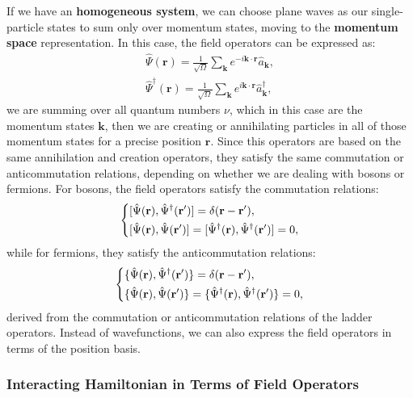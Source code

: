 If we have an \textbf{homogeneous system}, we can choose plane waves as our single-particle states to sum only over momentum states, moving to the \textbf{momentum space} representation. In this case, the field operators can be expressed as:
\[
    \begin{aligned}
        \hat{\Psi}(\mathbf{r}) = \frac{1}{\sqrt{\Omega}} \sum_{\mathbf{k}} e^{-i \mathbf{k} \cdot \mathbf{r}} \hat{a}_{\mathbf{k}}, \\
        \hat{\Psi}^\dagger(\mathbf{r}) = \frac{1}{\sqrt{\Omega}} \sum_{\mathbf{k}} e^{i \mathbf{k} \cdot \mathbf{r}} \hat{a}_{\mathbf{k}}^\dagger,
    \end{aligned}
\]
we are summing over all quantum numbers $\nu$, which in this case are the momentum states $\mathbf{k}$, then we are creating or annihilating particles in all of those momentum states for a precise position $\mathbf{r}$. Since this operators are based on the same annihilation and creation operators, they satisfy the same commutation or anticommutation relations, depending on whether we are dealing with bosons or fermions. For bosons, the field operators satisfy the commutation relations:
\[
    \begin{dcases}
        [\hat{\Psi}(\mathbf{r}), \hat{\Psi}^\dagger(\mathbf{r}')]  = \delta(\mathbf{r} - \mathbf{r}'), \\
        [\hat{\Psi}(\mathbf{r}), \hat{\Psi}(\mathbf{r}')] = [\hat{\Psi}^\dagger(\mathbf{r}), \hat{\Psi}^\dagger(\mathbf{r}')] = 0,
    \end{dcases}
\]
while for fermions, they satisfy the anticommutation relations:
\[
    \begin{dcases}
        \{\hat{\Psi}(\mathbf{r}), \hat{\Psi}^\dagger(\mathbf{r}')\} = \delta(\mathbf{r} - \mathbf{r}'), \\
        \{\hat{\Psi}(\mathbf{r}), \hat{\Psi}(\mathbf{r}')\} = \{\hat{\Psi}^\dagger(\mathbf{r}), \hat{\Psi}^\dagger(\mathbf{r}')\} = 0,
    \end{dcases}
\]
derived from the commutation or anticommutation relations of the ladder operators. Instead of wavefunctions, we can also express the field operators in terms of the position basis.

\subsubsection{Interacting Hamiltonian in Terms of Field Operators}

